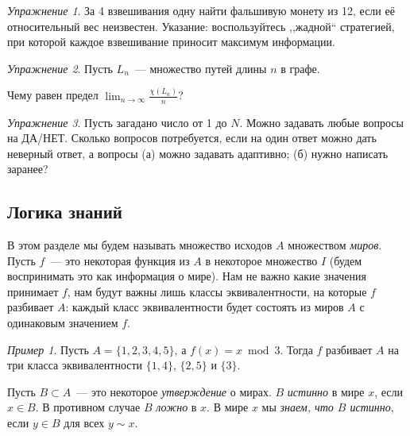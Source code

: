 \documentclass[12pt]{article}
\theoremstyle{definition}
\theoremstyle{plain}
\theoremstyle{remark}
\newtheorem{example}{Пример}[section]
\newtheorem{exercise}{Упражнение}[section]
\begin{document}
\begin{exercise}
За 4 взвешивания одну найти фальшивую монету из 12, если её относительный вес неизвестен. Указание: воспользуйтесь ,,жадной`` стратегией, при которой каждое взвешивание приносит максимум информации.
\end{exercise}

\begin{exercise}
Пусть \(L_n\)~— множество путей длины \(n\) в графе.
\begin{center}
\end{center}
Чему равен предел \(\lim_{n\to\infty} \frac{\chi(L_n)}{n}\)?
\end{exercise}

\begin{exercise}
Пусть загадано число от 1 до \(N\). Можно задавать любые вопросы на ДА/НЕТ. Сколько вопросов потребуется, если на один ответ можно дать неверный ответ, а вопросы (а) можно задавать адаптивно; (б) нужно написать заранее?
\end{exercise}

\subsection{Логика знаний}
В этом разделе мы будем называть множество исходов $A$ множеством \emph{миров}.
Пусть $f$~--- это некоторая функция из $A$ в некоторое множество $I$ (будем воспринимать это как информация о мире).
Нам не важно какие значения принимает $f$, нам будут важны лишь классы эквивалентности, на которые $f$ разбивает $A$:
каждый класс эквивалентности будет состоять из миров $A$ с одинаковым значением $f$.

\begin{example}
    Пусть $A = \{1,2,3,4,5\}$, а $f(x) = x \bmod 3$. Тогда $f$ разбивает $A$ на три класса эквивалентности 
    $\{1,4\}$, $\{2,5\}$ и $\{3\}$.
\end{example}

Пусть $B\subset A$~--- это некоторое \emph{утверждение} о мирах. $B$ \emph{истинно} в мире $x$, если $x\in B$.
В противном случае $B$ \emph{ложно} в $x$. В мире $x$ мы \emph{знаем, что $B$ истинно}, если $y \in B$ для всех 
$y\sim x$.
\end{document}
